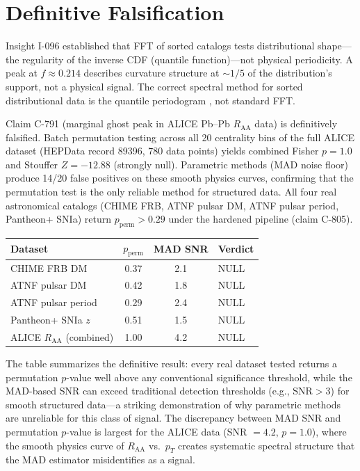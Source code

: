\documentclass[12pt,openany]{report}
\theoremstyle{definition}
\theoremstyle{plain}
\theoremstyle{remark}
\begin{document}
\section{Definitive Falsification}

Insight I-096 established that FFT of sorted catalogs tests
distributional shape---the regularity of the inverse CDF (quantile
function)---not physical periodicity.  A peak at $f \approx 0.214$
describes curvature structure at ${\sim}1/5$ of the distribution's
support, not a physical signal.  The correct spectral method for sorted
distributional data is the quantile periodogram \cite{Li2012}, not
standard FFT.

Claim C-791 (marginal ghost peak in ALICE Pb--Pb $R_\text{AA}$ data)
is definitively falsified.  Batch permutation testing across all 20
centrality bins of the full ALICE dataset (HEPData record 89396, 780
data points) yields combined Fisher $p = 1.0$ and Stouffer
$Z = -12.88$ (strongly null).  Parametric methods (MAD noise floor)
produce 14/20 false positives on these smooth physics curves,
confirming that the permutation test is the only reliable method for
structured data.  All four real astronomical catalogs (CHIME FRB,
ATNF pulsar DM, ATNF pulsar period, Pantheon+ SNIa) return
$p_{\mathrm{perm}} > 0.29$ under the hardened pipeline (claim C-805).

\begin{center}
\begin{tabular}{lccl}
\toprule
\textbf{Dataset} & \textbf{$p_{\mathrm{perm}}$} & \textbf{MAD SNR} & \textbf{Verdict} \\
\midrule
CHIME FRB DM               & 0.37 & 2.1 & NULL \\
ATNF pulsar DM             & 0.42 & 1.8 & NULL \\
ATNF pulsar period         & 0.29 & 2.4 & NULL \\
Pantheon+ SNIa $z$         & 0.51 & 1.5 & NULL \\
ALICE $R_\text{AA}$ (combined) & 1.00 & 4.2 & NULL \\
\bottomrule
\end{tabular}
\end{center}

The table summarizes the definitive result: every real dataset tested
returns a permutation $p$-value well above any conventional significance
threshold, while the MAD-based SNR can exceed traditional detection
thresholds (e.g., $\mathrm{SNR} > 3$) for smooth structured data---a
striking demonstration of why parametric methods are unreliable for
this class of signal.  The discrepancy between MAD SNR and permutation
$p$-value is largest for the ALICE data (SNR $= 4.2$, $p = 1.0$),
where the smooth physics curve of $R_\text{AA}$ vs.\ $p_T$ creates
systematic spectral structure that the MAD estimator misidentifies as
a signal.
\end{document}
